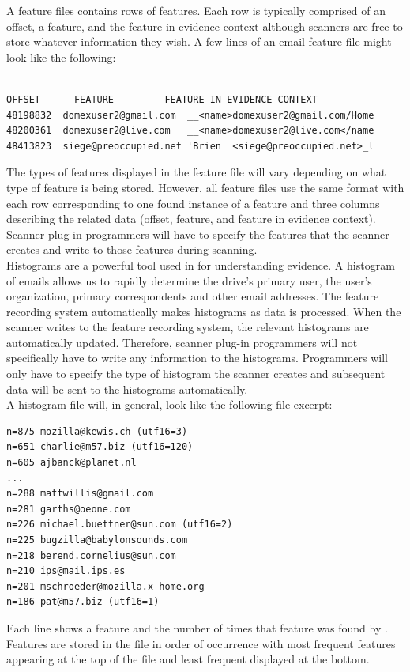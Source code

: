 \documentclass[11pt,fleqn]{article} %
\begin{document}
A feature files contains rows of features. Each row is typically comprised of an offset, a feature, and the feature in evidence context although scanners are free to store whatever information they wish. A few lines of an email feature file might look like the following:\\ \\

\lstset{style=customfile}
\begin{lstlisting}
OFFSET      FEATURE	        FEATURE IN EVIDENCE CONTEXT
48198832  domexuser2@gmail.com 	__<name>domexuser2@gmail.com/Home
48200361  domexuser2@live.com 	__<name>domexuser2@live.com</name
48413823  siege@preoccupied.net	'Brien  <siege@preoccupied.net>_l
\end{lstlisting}


The types of features displayed in the feature file will vary depending on what type of feature is being stored. However, all feature files use the same format with each row corresponding to one found instance of a feature and three columns describing the related data (offset, feature, and feature in evidence context). Scanner plug-in programmers will have to specify the features that the scanner creates and write to those features during scanning. \\

Histograms are a powerful tool used in \bulk for understanding evidence. A histogram of emails allows us to rapidly determine the drive's primary user, the user's organization, primary correspondents and other email addresses. The feature recording system automatically makes histograms as data is processed. When the scanner writes to the feature recording system, the relevant histograms are automatically updated. Therefore, scanner plug-in programmers will not specifically have to write any information to the histograms. Programmers will only have to specify the type of histogram the scanner creates and subsequent data will be sent to the histograms automatically. \\ 

A histogram file will, in general, look like the following file excerpt:
\lstset{style=customfile}
\begin{lstlisting}
n=875 mozilla@kewis.ch (utf16=3)
n=651 charlie@m57.biz (utf16=120)
n=605 ajbanck@planet.nl
...
n=288 mattwillis@gmail.com
n=281 garths@oeone.com
n=226 michael.buettner@sun.com (utf16=2)
n=225 bugzilla@babylonsounds.com
n=218 berend.cornelius@sun.com
n=210 ips@mail.ips.es
n=201 mschroeder@mozilla.x-home.org
n=186 pat@m57.biz (utf16=1)
\end{lstlisting}
Each line shows a feature and the number of times that feature was found by \bulk. Features are stored in the file in order of occurrence with most frequent features appearing at the top of the file and least frequent displayed at the bottom. \\
\end{document}
